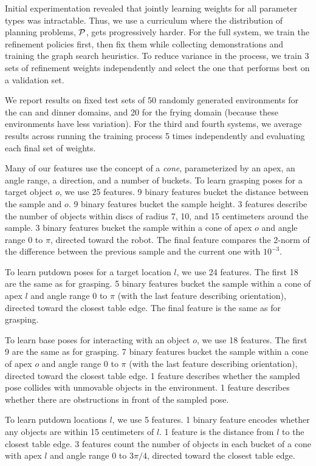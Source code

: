 Initial experimentation revealed that jointly learning weights for all
parameter types was intractable. Thus, we use a curriculum where the
distribution of planning problems, $\mathcal{P}$, gets progressively
harder. For the full system, we train the refinement policies first,
then fix them while collecting demonstrations and training the graph
search heuristics. To reduce variance in the process, we train 3 sets
of refinement weights independently and select the one that performs
best on a validation set.

We report results on fixed test sets of 50 randomly generated
environments for the can and dinner domains, and 20 for the frying
domain (because these environments have less variation).  For the
third and fourth systems, we average results across running the
training process 5 times independently and evaluating each final set
of weights.

Many of our features use the concept of a \emph{cone}, parameterized by an apex,
an angle range, a direction, and a number of buckets.
To learn grasping poses for a target object $o$, we use 25 features.
9 binary features bucket the distance between
the sample and $o$. 9 binary features bucket the
sample height. 3 features describe the number of objects within
discs of radius 7, 10, and 15 centimeters around the sample. 3 binary
features bucket the sample within a cone of apex $o$ and angle range 0 to $\pi$, directed
toward the robot. The final feature compares the 2-norm of
the difference between the previous sample and the current one with $10^{-3}$.

To learn putdown poses for a target location $l$, we use 24 features. The first
18 are the same as for grasping. 5 binary features bucket the sample within
a cone of apex $l$ and angle range 0 to $\pi$ (with the last feature describing
orientation), directed toward the closest table edge. The final feature is the same as
for grasping.

To learn base poses for interacting with an object $o$, we use 18 features. The first 9 are the same as
for grasping. 7 binary features bucket the sample within a cone of apex $o$ and angle range 0 to $\pi$
(with the last feature describing orientation), directed toward the closest table edge.
1 feature describes whether the sampled pose collides with unmovable objects in the environment.
1 feature describes whether there are obstructions in front of the sampled pose.

To learn putdown locations $l$, we use 5 features. 1 binary feature encodes whether
any objects are within 15 centimeters of $l$. 1 feature is the
distance from $l$ to the closest table edge. 3 features count the number of objects
in each bucket of a cone with apex $l$ and angle range 0 to $3\pi/4$, directed toward the closest table edge.

